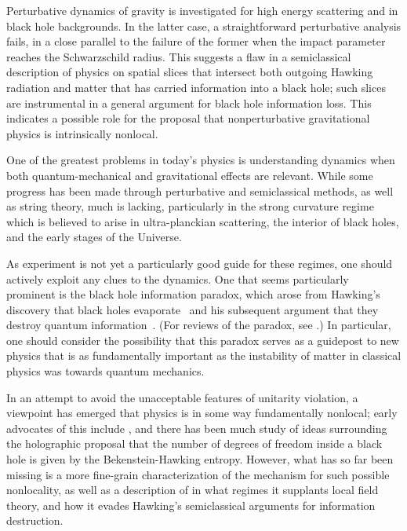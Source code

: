 Perturbative dynamics of gravity is investigated for high energy scattering and in black hole backgrounds.  In the latter case, a straightforward perturbative analysis fails, in a close parallel to the failure of the former when the impact parameter reaches the Schwarzschild radius.  This suggests a flaw in a semiclassical description of physics on spatial slices that intersect both outgoing Hawking radiation and matter that has carried information into a black hole; such slices are instrumental in a general argument for black hole information loss.  This indicates a possible role for the proposal that nonperturbative gravitational physics is intrinsically nonlocal.

\Date{}


One of the greatest problems in today's physics is understanding dynamics when both quantum-mechanical and gravitational effects are relevant.  While some progress has been made through perturbative and semiclassical methods, as well as string theory, much is lacking, particularly in the strong curvature regime which is believed to arise in ultra-planckian scattering, the interior of black holes, and the early stages of the Universe.   

As experiment is not yet a particularly good guide for these regimes, one should actively exploit any clues to the dynamics.  One that seems particularly prominent is the black hole information paradox, which arose from Hawking's discovery that black holes evaporate~ and his subsequent argument that they destroy quantum information~.  (For reviews of the paradox, see .)  In particular, one should consider the possibility that this paradox serves as a guidepost to new physics that is as fundamentally important as  the instability of matter in classical physics was towards quantum mechanics.  

In an attempt to avoid the unacceptable features of unitarity violation, a viewpoint has emerged that physics is in some way fundamentally nonlocal; early advocates of this include , and there has been much study of ideas surrounding the holographic proposal that the number of degrees of freedom inside a black hole is given by the Bekenstein-Hawking entropy.  However, what has so far been missing is a more fine-grain characterization of the mechanism for such possible nonlocality, as well as a description of in what regimes it supplants  local field theory, and how  it evades Hawking's semiclassical arguments for information destruction.  

